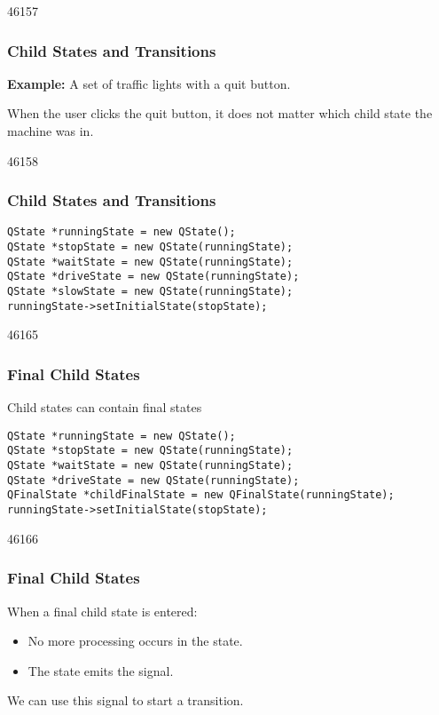 \begin{slide}{46157}\frametitle{Child States and Transitions}
\textbf{Example:} A set of traffic lights with a quit button.


\vspace*{0.5em}
When the user clicks the quit button, it does not matter which child state
the machine was in.
\end{slide}

\begin{slide}[fragile]{46158}\frametitle{Child States and Transitions}
\vspace*{1.5em}
\small
\begin{lstlisting}
QState *runningState = new QState();
QState *stopState = new QState(runningState);
QState *waitState = new QState(runningState);
QState *driveState = new QState(runningState);
QState *slowState = new QState(runningState);
runningState->setInitialState(stopState);
\end{lstlisting}
\normalsize
{}
\vfill
\end{slide}

\begin{slide}[fragile]{46165}\frametitle{Final Child States}
Child states can contain final states

\vspace*{1.0em}
\vfill
\small
\begin{lstlisting}
QState *runningState = new QState();
QState *stopState = new QState(runningState);
QState *waitState = new QState(runningState);
QState *driveState = new QState(runningState);
QFinalState *childFinalState = new QFinalState(runningState);
runningState->setInitialState(stopState);
\end{lstlisting}
\normalsize
\end{slide}

\begin{slide}{46166}\frametitle{Final Child States}

When a final child state is entered:
\begin{itemize}
\item No more processing occurs in the state.
\item The state emits the  signal.
\end{itemize}

We can use this signal to start a transition.
\end{slide}

